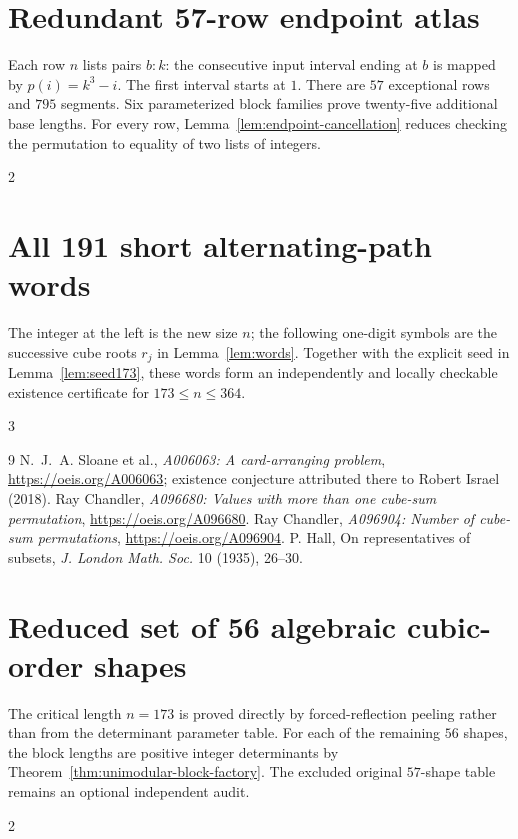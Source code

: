 \documentclass[10pt]{article}
\begin{document}
\section{Redundant 57-row endpoint atlas}
\label{app:interval-atlas}

\noindent Each row $n$ lists pairs $b:k$:
the consecutive input interval ending at $b$
is mapped by $p(i)=k^3-i$.
The first interval starts at $1$.
There are $57$ exceptional rows and $795$
segments. Six parameterized block families
prove twenty-five additional base lengths. For every row,
Lemma~\ref{lem:endpoint-cancellation}
reduces checking the permutation
to equality of two lists of integers.

\begin{multicols}{2}
\scriptsize\ttfamily
\setlength{\parindent}{0pt}
\setlength{\parskip}{2pt}

\end{multicols}

\clearpage
\section{All 191 short alternating-path words}
\noindent The integer at the left is the new size $n$;
the following one-digit symbols are the successive
cube roots $r_j$ in Lemma~\ref{lem:words}.
Together with the explicit seed in
Lemma~\ref{lem:seed173}, these words form an
independently and locally checkable existence
certificate for $173\le n\le364$.

\begin{multicols}{3}
\scriptsize\ttfamily
\setlength{\parindent}{0pt}
\setlength{\parskip}{0pt}

\end{multicols}

\begin{thebibliography}{9}
N.~J.~A. Sloane et al., \emph{A006063: A card-arranging problem},
\url{https://oeis.org/A006063}; existence conjecture
attributed there to Robert Israel (2018).
Ray Chandler, \emph{A096680: Values with more than one cube-sum
permutation}, \url{https://oeis.org/A096680}.
Ray Chandler, \emph{A096904: Number of cube-sum permutations},
\url{https://oeis.org/A096904}.
P. Hall, On representatives of subsets,
\emph{J. London Math. Soc.} 10 (1935), 26--30.
\end{thebibliography}

\clearpage
\section{Reduced set of 56 algebraic cubic-order shapes}
\label{app:reduced-shapes}
The critical length $n=173$ is proved directly
by forced-reflection peeling rather than from
the determinant parameter table. For each of
the remaining $56$ shapes, the block lengths
are positive integer determinants by
Theorem~\ref{thm:unimodular-block-factory}.
The excluded original $57$-shape table
remains an optional independent audit.
\begin{multicols}{2}
\scriptsize
\setlength{\parindent}{0pt}
\setlength{\parskip}{2pt}

\end{multicols}
\end{document}

